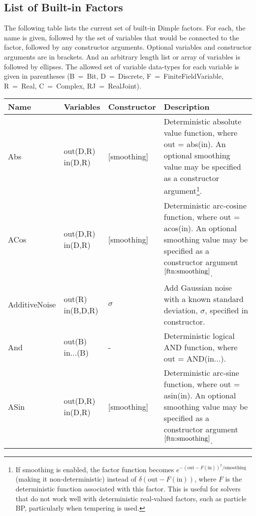 \subsection{List of Built-in Factors}
\label{sec:builtInFactors}

The following table lists the current set of built-in Dimple factors.  For each, the name is given, followed by the set of variables that would be connected to the factor, followed by any constructor arguments.  Optional variables and constructor arguments are in brackets.  And an arbitrary length list or array of variables is followed by ellipses.  The allowed set of variable data-types for each variable is given in parentheses (B~=~Bit, D~=~Discrete, F~=~FiniteFieldVariable, R~=~Real, C~=~Complex, RJ~=~RealJoint).

\begin{longtable} {p{3.5cm} p{2.2cm} p{2cm} p{7cm}}
Name & Variables & Constructor & Description \\
\hline
\endhead
%
Abs & out(D,R) \newline in(D,R) & [smoothing] & Deterministic absolute value function, where out = abs(in).  An optional smoothing value may be specified as a constructor argument\footnote{\label{ftn:smoothing}If smoothing is enabled, the factor function becomes $e^{-(\textrm{out} - F(\textrm{in}))^2/\textrm{smoothing}}$ (making it non-deterministic) instead of $\delta(\textrm{out} - F(\textrm{in}))$, where $F$ is the deterministic function associated with this factor.  This is useful for solvers that do not work well with deterministic real-valued factors, such as particle BP, particularly when tempering is used.}.\\
%
ACos & out(D,R) \newline in(D,R) & [smoothing] & Deterministic arc-cosine function, where out = acos(in). An optional smoothing value may be specified as a constructor argument$^{\ref{ftn:smoothing}}$. \\
%
AdditiveNoise & out(R) \newline in(B,D,R) & $\sigma$ & Add Gaussian noise with a known standard deviation, $\sigma$, specified in constructor. \\
%
And & out(B) \newline in...(B) & - & Deterministic logical AND function, where out = AND(in...). \\
%
ASin & out(D,R) \newline in(D,R) & [smoothing] & Deterministic arc-sine function, where out = asin(in). An optional smoothing value may be specified as a constructor argument$^{\ref{ftn:smoothing}}$. \\

\end{longtable}
